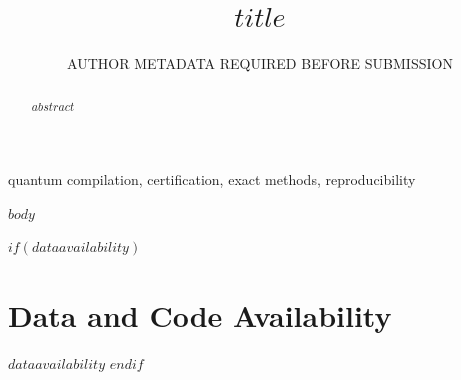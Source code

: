 \documentclass[journal,onecolumn]{IEEEtran}
\title{$title$}
\author{AUTHOR METADATA REQUIRED BEFORE SUBMISSION}
\begin{document}
\maketitle

\begin{abstract}
$abstract$
\end{abstract}

\begin{IEEEkeywords}
quantum compilation, certification, exact methods, reproducibility
\end{IEEEkeywords}

$body$

$if(dataavailability)$
\section*{Data and Code Availability}
$dataavailability$
$endif$



\end{document}
